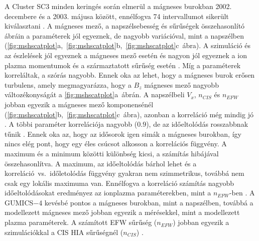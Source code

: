\documentclass[b5paper,10pt]{article}
\begin{document}
A Cluster SC3 minden keringés során elmerül a mágneses burokban 2002. decembere és a 2003. májusa között, ennélfogva 74 intervallumot sikerült kiválasztani \cite{facsko21:_compar_gumic_terres_magnet_clust_measur}. A mágneses mező, a napszélsebesség és sűrűségek összehasonlító ábráin a paraméterek jól egyeznek, de nagyobb variációval, mint a napszélben (\ref{fig:mshscatplot}a,~\ref{fig:mshscatplot}b,~\ref{fig:mshscatplot}c~ábra). A szimuláció és az észlelések jól egyeznek a mágneses mező esetén \cite{facsko21:_compar_gumic_terres_magnet_clust_measur} és nagyon jól egyeznek a ion plazma momentumok és a származtatott sűrűség esetén \cite{facsko21:_compar_gumic_terres_magnet_clust_measur}.  Míg a paraméterek korreláltak, a szórás nagyobb. Ennek oka az lehet, hogy a mágneses burok erősen turbulens, amely megmagyarázza, hogy a $B_{z}$ mágneses mező nagyobb változékonyságát a \ref{fig:mshscatplot}a~ábrán. A napszélbeli $V_{x}$, $n_{CIS}$ és $n_{EFW}$ jobban egyezik a mágneses mező komponensénél (\ref{fig:mshscatplot}b,~\ref{fig:mshscatplot}c~ábra), azonban a korreláció még mindig jó \cite{facsko21:_compar_gumic_terres_magnet_clust_measur}. A többi paraméter korrelációja nagyobb ($0.9$), de az időeltolódás rosszabbnak tűnik \cite{facsko21:_compar_gumic_terres_magnet_clust_measur}. Ennek oka az, hogy az idősorok igen simák a mágneses burokban, így nincs elég pont, hogy egy éles csúcsot alkosson a korrelációs függvény. A maximum és a minimum közötti különbség kicsi, a számítás hibájával összehasonlítva. A maximum, az időeltolódás bárhol lehet és a korreláció~vs.~időletolódás függvény gyakran nem szimmetrikus, továbbá nem csak egy lokális maximuma van. Ennélfogva a korreláció számítás nagyobb időeltolódásokat eredményez az ionplazma paraméterekben, mint a $n_{EFW}$-ben \cite{facsko21:_compar_gumic_terres_magnet_clust_measur}. A GUMICS$-$4 kevésbé pontos a mágneses burokban, mint a napszélben, továbbá a modellezett mágneses mező jobban egyezik a mérésekkel, mint a modellezett plazma paraméterek. A számított EFW sűrűség ($n_{EFW}$) jobban egyezik a szimulációkkal a CIS HIA sűrűségnél ($n_{CIS}$) \cite{facsko21:_compar_gumic_terres_magnet_clust_measur}.
\end{document}
